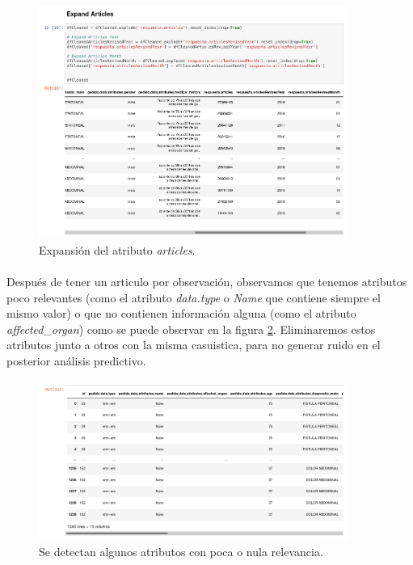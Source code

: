 \documentclass[10pt,a4paper,oneside]{book}
\begin{document}
\paragraph{}
\begin{figure}[!htb]
  \centering
    \includegraphics[width=0.9\textwidth]{images/metodologia_procesado_de_datos_expandir_articulos.png}
    \caption{Expansión del atributo \textit{articles}.}
  \label{expandArticles}
\end{figure}

\paragraph{}
Después de tener un articulo por observación, observamos que tenemos atributos poco relevantes (como el atributo \textit{data.type} o \textit{Name} que contiene siempre el mismo valor) o que no contienen información alguna (como el atributo \textit{affected\_organ}) como se puede observar en la figura \ref{atributesEmpty}. Eliminaremos estos atributos junto a otros con la misma casuistica, para no generar ruido en el posterior análisis predictivo.

\paragraph{}
\begin{figure}[!htb]
  \centering
    \includegraphics[width=0.9\textwidth]{images/metodologia_analisis_datos_atributos_sin_valor.png}
    \caption{Se detectan algunos atributos con poca o nula relevancia.}
  \label{atributesEmpty}
\end{figure}
\end{document}
